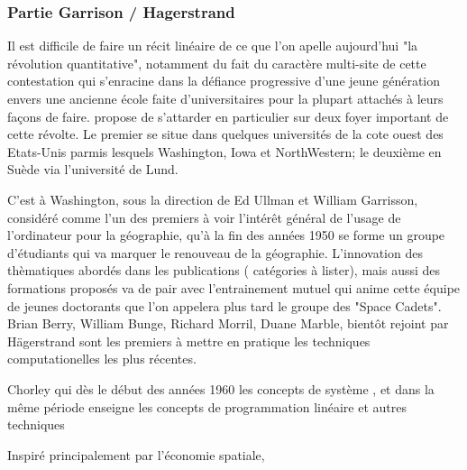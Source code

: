 \subsubsection{Partie Garrison / Hagerstrand}



Il est difficile de faire un récit linéaire de ce que l'on apelle aujourd'hui "la révolution quantitative", notamment du fait du caractère multi-site de cette contestation qui s'enracine dans la défiance progressive d'une jeune génération envers une ancienne école faite d'universitaires pour la plupart attachés à leurs façons de faire. \autocite{Gould2004}  propose de s'attarder en particulier sur deux foyer important de cette révolte. Le premier se situe dans quelques universités de la cote ouest des Etats-Unis \autocite{Gould2004} parmis lesquels Washington, Iowa et NorthWestern; le deuxième en Suède via l'université de Lund.

C'est à Washington, sous la direction de Ed Ullman et William Garrisson, considéré comme l'un des premiers à voir l'intérêt général de l'usage de l'ordinateur pour la géographie, qu'à la fin des années 1950 se forme un groupe d'étudiants qui va marquer le renouveau de la géographie.  L'innovation des thèmatiques abordés dans les publications ( catégories à lister), mais aussi des formations proposés va de pair avec l'entrainement mutuel qui anime cette équipe de jeunes doctorants que l'on appelera plus tard le groupe des "Space Cadets". Brian Berry, William Bunge, Richard Morril, Duane Marble, bientôt rejoint par Hägerstrand sont les premiers à mettre en pratique les techniques computationelles les plus récentes. 

Chorley qui dès le début des années 1960 les concepts de système  \autocite{Johnston2004} , et dans la même période enseigne les concepts de programmation linéaire et autres techniques \autocite{Haggett1969}

Inspiré principalement par l'économie spatiale, %

